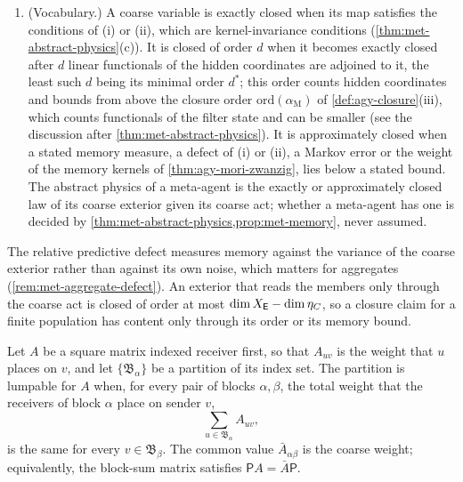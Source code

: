 \begin{definition}
\begin{enumerate}
\item[(iii)] (Vocabulary.) A coarse variable is exactly closed when its map satisfies the conditions of (i) or (ii), which are kernel-invariance conditions (\cref{thm:met-abstract-physics}(c)). It is closed of order $d$ when it becomes exactly closed after $d$ linear functionals of the hidden coordinates are adjoined to it, the least such $d$ being its minimal order $d^\ast$; this order counts hidden coordinates and bounds from above the closure order $\mathrm{ord}(\alpha_{\mathrm M})$ of \cref{def:agy-closure}(iii), which counts functionals of the filter state and can be smaller (see the discussion after \cref{thm:met-abstract-physics}). It is approximately closed when a stated memory measure, a defect of (i) or (ii), a Markov error or the weight of the memory kernels of \cref{thm:agy-mori-zwanzig}, lies below a stated bound. The abstract physics of a meta-agent is the exactly or approximately closed law of its coarse exterior given its coarse act; whether a meta-agent has one is decided by \cref{thm:met-abstract-physics,prop:met-memory}, never assumed.
\end{enumerate}
\end{definition}

The relative predictive defect measures memory against the variance of the coarse exterior rather than against its own noise, which matters for aggregates (\cref{rem:met-aggregate-defect}). An exterior that reads the members only through the coarse act is closed of order at most $\dim X_{\mathsf{E}}-\dim\eta_C$, so a closure claim for a finite population has content only through its order or its memory bound.

\begin{definition}\label{def:met-lumpable}
Let $A$ be a square matrix indexed receiver first, so that $A_{uv}$ is the weight that $u$ places on $v$, and let $\{\mathfrak B_\alpha\}$ be a partition of its index set. The partition is lumpable for $A$ when, for every pair of blocks $\alpha,\beta$, the total weight that the receivers of block $\alpha$ place on sender $v$,
\begin{equation}\label{eq:met-lumpable}
\sum_{u\in\mathfrak B_\alpha}A_{uv},
\end{equation}
is the same for every $v\in\mathfrak B_\beta$. The common value $\bar A_{\alpha\beta}$ is the coarse weight; equivalently, the block-sum matrix satisfies $\mathsf PA=\bar A\mathsf P$.
\end{definition}

